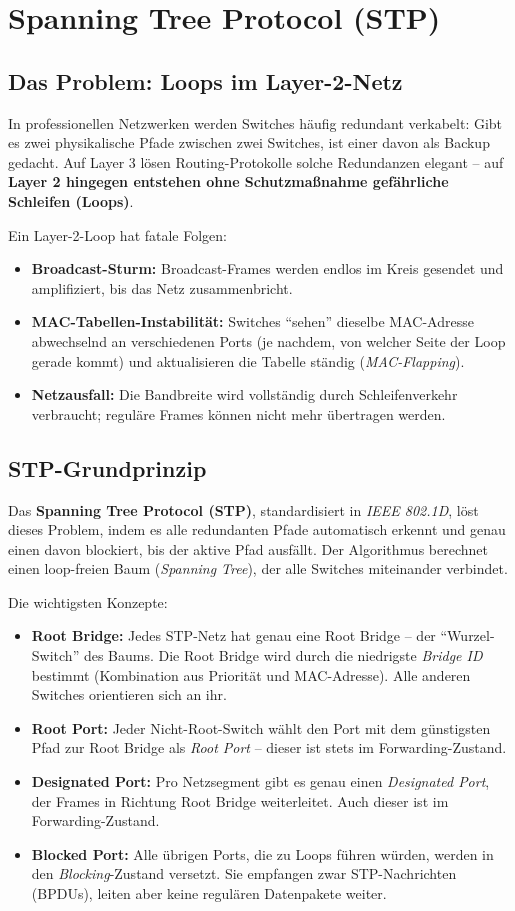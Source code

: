 \documentclass[11pt, oneside, numbers=nönddot]{scrbook}
\begin{document}
\newpage

\section{Spanning Tree Protocol (STP)}
\subsection{Das Problem: Loops im Layer-2-Netz}
In professionellen Netzwerken werden Switches häufig redundant verkabelt: Gibt es zwei physikalische Pfade zwischen zwei Switches, ist einer davon als Backup gedacht. Auf Layer 3 lösen Routing-Protokolle solche Redundanzen elegant -- auf \textbf{Layer 2 hingegen entstehen ohne Schutzmaßnahme gefährliche Schleifen (Loops)}.

Ein Layer-2-Loop hat fatale Folgen:
\begin{itemize}
\item \textbf{Broadcast-Sturm:} Broadcast-Frames werden endlos im Kreis gesendet und amplifiziert, bis das Netz zusammenbricht.
\item \textbf{MAC-Tabellen-Instabilität:} Switches ``sehen'' dieselbe MAC-Adresse abwechselnd an verschiedenen Ports (je nachdem, von welcher Seite der Loop gerade kommt) und aktualisieren die Tabelle ständig (\textit{MAC-Flapping}).
\item \textbf{Netzausfall:} Die Bandbreite wird vollständig durch Schleifenverkehr verbraucht; reguläre Frames können nicht mehr übertragen werden.
\end{itemize}

\subsection{STP-Grundprinzip}
Das \textbf{Spanning Tree Protocol (STP)}, standardisiert in \textit{IEEE 802.1D}, löst dieses Problem, indem es alle redundanten Pfade automatisch erkennt und genau einen davon blockiert, bis der aktive Pfad ausfällt. Der Algorithmus berechnet einen loop-freien Baum (\textit{Spanning Tree}), der alle Switches miteinander verbindet.

Die wichtigsten Konzepte:
\begin{itemize}
\item \textbf{Root Bridge:} Jedes STP-Netz hat genau eine Root Bridge -- der ``Wurzel-Switch'' des Baums. Die Root Bridge wird durch die niedrigste \textit{Bridge ID} bestimmt (Kombination aus Priorität und MAC-Adresse). Alle anderen Switches orientieren sich an ihr.
\item \textbf{Root Port:} Jeder Nicht-Root-Switch wählt den Port mit dem günstigsten Pfad zur Root Bridge als \textit{Root Port} -- dieser ist stets im Forwarding-Zustand.
\item \textbf{Designated Port:} Pro Netzsegment gibt es genau einen \textit{Designated Port}, der Frames in Richtung Root Bridge weiterleitet. Auch dieser ist im Forwarding-Zustand.
\item \textbf{Blocked Port:} Alle übrigen Ports, die zu Loops führen würden, werden in den \textit{Blocking}-Zustand versetzt. Sie empfangen zwar STP-Nachrichten (BPDUs), leiten aber keine regulären Datenpakete weiter.
\end{itemize}
\end{document}
